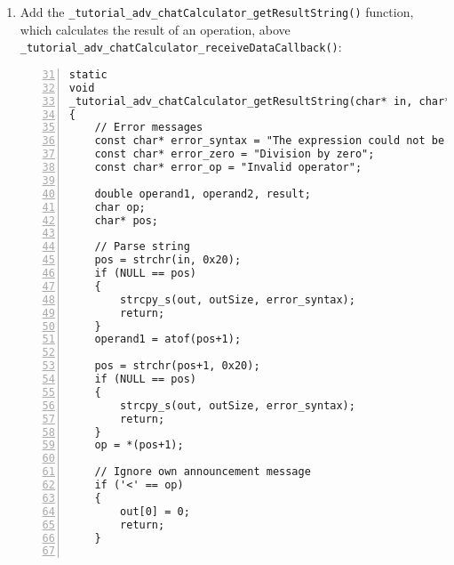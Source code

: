 \begin{enumerate}
\begin{lstlisting}[numbers=left,firstnumber=28,breaklines]
/*	// TODO: Add code */                    /~~/ Comment or remove this block
//	XME_LOG(XME_LOG_NOTE, "Receive data callback function called!\n");
	
/*	// Example: Print data to screen */     /~~/ Comment or remove this block
//	{
//		const char* message = xme_hal_sharedPtr_getPointer(dataHandle);
//		XME_LOG(XME_LOG_NOTE, "Received: %s\n", message);
//	}

	/~~/ Add all the following lines

	char* input = (char*)xme_hal_sharedPtr_getPointer(dataHandle);
	int size = xme_hal_sharedPtr_getSize(dataHandle);

	// Output data
	char output[512];

	// Sanitize input
	input[size-1] = 0;

	// Strip person's name
	input = strchr(input, ':');
	if (NULL == input)
	{
		// Invalid message format
		return;
	}
	input += 2;

	if (0 != strncmp(input, "!calc ", 6))
	{
		// Not a calculation command
		return;
	}

	_tutorial_adv_chatCalculator_getResultString
	(
		input, output, sizeof(output)
	);

	if (0 != strlen(output))
	{
		xme_core_dcc_sendTopicData
		(
			config->publicationHandle,
			(void*)output, strlen(output)+1
		);
	}
}
\end{lstlisting}

	\item Add the \verb|_tutorial_adv_chatCalculator_getResultString()| function, which calculates the result of an operation,
		above \verb|_tutorial_adv_chatCalculator_receiveDataCallback()|:

\begin{lstlisting}[numbers=left,firstnumber=31]
static
void
_tutorial_adv_chatCalculator_getResultString(char* in, char* out, int outSize)
{
	// Error messages
	const char* error_syntax = "The expression could not be evaluated";
	const char* error_zero = "Division by zero";
	const char* error_op = "Invalid operator";

	double operand1, operand2, result;
	char op;
	char* pos;

	// Parse string
	pos = strchr(in, 0x20);
	if (NULL == pos)
	{
		strcpy_s(out, outSize, error_syntax);
		return;
	}
	operand1 = atof(pos+1);

	pos = strchr(pos+1, 0x20);
	if (NULL == pos)
	{
		strcpy_s(out, outSize, error_syntax);
		return;
	}
	op = *(pos+1);
	
	// Ignore own announcement message
	if ('<' == op)
	{
		out[0] = 0;
		return;
	}


\end{lstlisting}
\end{enumerate}
